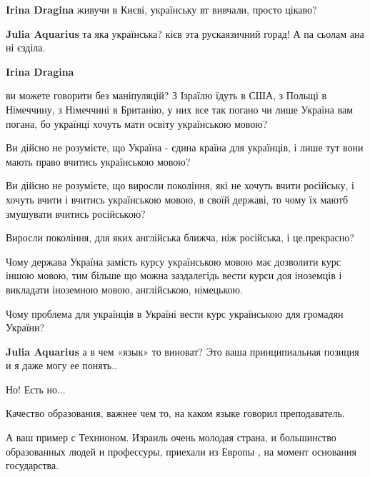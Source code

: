 \begin{itemize}
\begin{itemize}
\textbf{Irina Dragina} живучи в Києві, українську вт вивчали, просто цікаво?

 
\textbf{Julia Aquarius} та яка українська? кієв эта рускаязичний горад! А па сьолам ана ні єзділа.

 
\textbf{Irina Dragina} 

ви можете говорити без маніпуляцій? З Ізраїлю їдуть в США, з Польщі в
Німеччину, з Німеччині в Британію, у них все так погано чи лише Україна вам
погана, бо українці хочуть мати освіту українською мовою? 

Ви дійсно не розумієте, що Україна - єдина країна для українців, і лише тут
вони мають право вчитись українською мовою? 

Ви дійсно не розумієте, що виросли покоління, які не хочуть вчити російську, і
хочуть вчити і вчитись українською мовою, в своїй державі, то чому їх маютб
змушувати вчитись російською?

Виросли покоління, для яких англійська ближча, ніж російська, і це.прекрасно? 

Чому держава Україна замість курсу українською мовою має дозволити курс іншою
мовою, тим більше що можна заздалегідь вести курси доя іноземців і викладати
іноземною мовою, англійською, німецькою. 

Чому проблема для українців в Україні вести курс українською для громадян
України?

 
\textbf{Julia Aquarius} а в чем «язык» то виноват?
Это ваша принципиальная позиция и я даже могу ее понять..

Но! Есть но...

Качество образования, важнее чем то, на каком языке говорил преподаватель.

А ваш пример с Технионом. Израиль очень молодая страна, и большинство
образованных людей и профессуры, приехали из Европы , на момент основания
государства.


\end{itemize}
\end{itemize}
